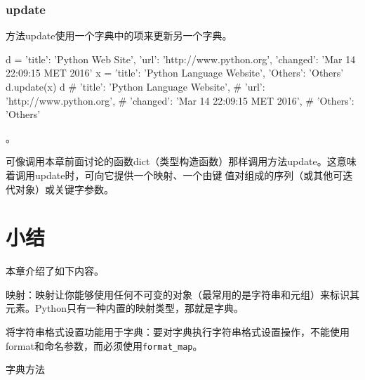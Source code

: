 \subsubsection{update}
方法update使用一个字典中的项来更新另一个字典。
\begin{pyc}
d = {
    'title': 'Python Web Site',
    'url': 'http://www.python.org',
    'changed': 'Mar 14 22:09:15 MET 2016'
}
x = {'title': 'Python Language Website', 'Others': 'Others'}
d.update(x)
d
# {'title': 'Python Language Website',
#  'url': 'http://www.python.org',
#  'changed': 'Mar 14 22:09:15 MET 2016',
#  'Others': 'Others'}
\end{pyc}
。

可像调用本章前面讨论的函数dict（类型构造函数）那样调用方法update。这意味着调用update时，可向它提供一个映射、一个由键值对组成的序列（或其他可迭代对象）或关键字参数。
\section{小结}
本章介绍了如下内容。
\begin{dinglist}{43}
    \item 映射：映射让你能够使用任何不可变的对象（最常用的是字符串和元组）来标识其元素。Python只有一种内置的映射类型，那就是字典。
    \item 将字符串格式设置功能用于字典：要对字典执行字符串格式设置操作，不能使用format和命名参数，而必须使用\verb|format_map|。
    \item 字典方法
\end{dinglist}

